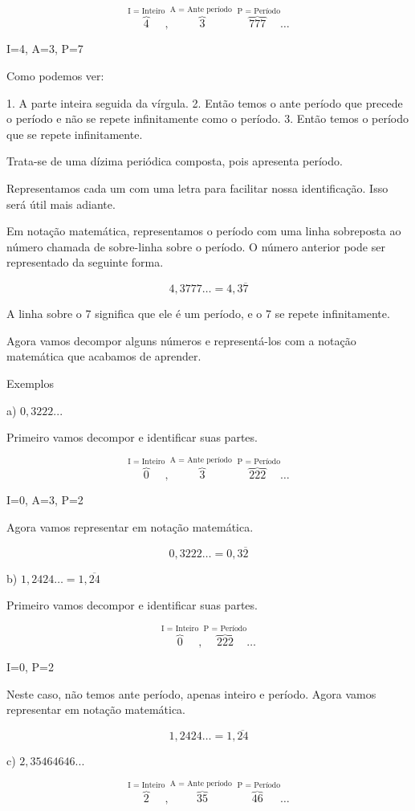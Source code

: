 \documentclass[letterpaper]{book}
\begin{document}
\[\overbrace{4}^{\text{I = Inteiro}},\overbrace{3}^{\text{A = Ante período }}\overbrace{777}^{\text{ P = Período}}\ldots\]

I=4, A=3, P=7

Como podemos ver:

1. A parte inteira seguida da vírgula.
2. Então temos o ante período que precede o período e não se repete infinitamente como o período.
3. Então temos o período que se repete infinitamente.

Trata-se de uma dízima periódica composta, pois apresenta período.

Representamos cada um com uma letra para facilitar nossa identificação. Isso será útil mais adiante.

Em notação matemática, representamos o período com uma linha sobreposta ao número chamada de sobre-linha sobre o período. O número anterior pode ser representado da seguinte forma.

\[4,3777\ldots = 4,3\overline{7}\]

A linha sobre o 7 significa que ele é um período, e o 7 se repete infinitamente.

Agora vamos decompor alguns números e representá-los com a notação matemática que acabamos de aprender.

Exemplos

a) \(0,3222...\)

Primeiro vamos decompor e identificar suas partes.

\[\overbrace{0}^{\text{I = Inteiro}},\overbrace{3}^{\text{A = Ante período }}\overbrace{222}^{\text{ P = Período}}\ldots\]

I=0, A=3, P=2

Agora vamos representar em notação matemática.

\[0,3222\ldots = 0,3\overline{2}\]

b) \(1,2424\ldots = 1,\overline{24}\)

Primeiro vamos decompor e identificar suas partes.

\[\overbrace{0}^{\text{I = Inteiro}},\overbrace{222}^{\text{P = Período}}\ldots\]

I=0, P=2

Neste caso, não temos ante período, apenas inteiro e período. Agora vamos representar em notação matemática.

\[1,2424\ldots = 1,\overline{24}\]

c) \(2,35464646...\)

\[\overbrace{2}^{\text{I = Inteiro}},\overbrace{35}^{\text{A = Ante período }}\overbrace{46}^{\text{ P = Período}}\ldots\]
\end{document}
